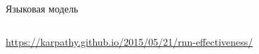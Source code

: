 \documentclass[notes,12pt, aspectratio=169]{beamer}
\begin{document}
\begin{frame}{Языковая модель}
\begin{columns}
\begin{column}{.7\linewidth}
\begin{center}
			\end{center}
		\end{column}	
	\end{columns}
	\vfill 
	\footnotesize 
	\color{blue} \url{https://karpathy.github.io/2015/05/21/rnn-effectiveness/} 
\end{frame}
\end{document}
